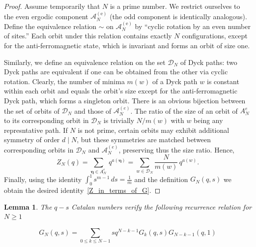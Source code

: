 \documentclass[pdflatex,sn-mathphys-num]{sn-jnl}
\newtheorem{lemma}[theorem]{Lemma}
\theoremstyle{definition}
\theoremstyle{remark}
\numberwithin{equation}{section}
\newcommand{\bfeta}{\boldsymbol{\eta}}
\begin{document}
\begin{proof}
Assume temporarily that $N$ is a prime number.  
We restrict ourselves to the even ergodic component $\mathcal{A}^{(\mathrm e)}_N$ (the odd component is identically analogous).  Define the equivalence relation $\sim$ on $\mathcal{A}^{(\mathrm e)}_N$ by “cyclic rotation by an even number of sites.”  Each orbit under this relation contains exactly $N$ configurations, except for the anti-ferromagnetic state, which is invariant and forms an orbit of size one.

Similarly, we define an equivalence relation on the set $\mathcal{D}_N$ of Dyck paths: two Dyck paths are equivalent if one can be obtained from the other via cyclic rotation.  
Clearly, the number of minima $m(w)$ of a Dyck path $w$ is constant within each orbit and equals the orbit's size except for the anti-ferromagnetic Dyck path, which forms a singleton orbit. There is an obvious bijection between the set of orbits of $\mathcal{D}_N$ and those of $\mathcal{A}_N^{(e)}$.  The ratio of the size of an orbit of $A_N^{e}$ to its corresponding orbit in $\mathcal{D}_N$ is trivially $N/m(w)$ with $w$ being any represntative path. If $N$ is not prime, certain orbits may exhibit additional symmetry of order $d \mid N$, but these symmetries are matched between corresponding orbits in $\mathcal{D}_N$ and $\mathcal{A}_N^{(e)}$, preserving thus the size ratio.
Hence,
\[
  Z_N(q) =\sum_{\bfeta \in A_N^{e}} \,q^{a(\bfeta )}
  =
  \sum_{w \in \mathcal{D}_N} \frac{N}{m(w)}\,q^{a(w)}.
\]
Finally, using the identity $\int_{0}^{1} s^{m-1} \, ds = \frac{1}{m}$ and the definition
  $G_N(q,s)$
we obtain the desired identity~\eqref{Z_in_terms_of_G}.
\end{proof}











\begin{lemma}
     The $q\!-\!s$  Catalan numbers verify the following recurrence relation for $N \geq 1$

\begin{equation}\label{rec}
    G_{N}(q,s) = \sum_{0 \leq k \leq N-1} s q^{N-k-1} G_{k}(q,s) G_{N-k-1}(q,1) 
\end{equation}
\end{lemma}
\end{document}
